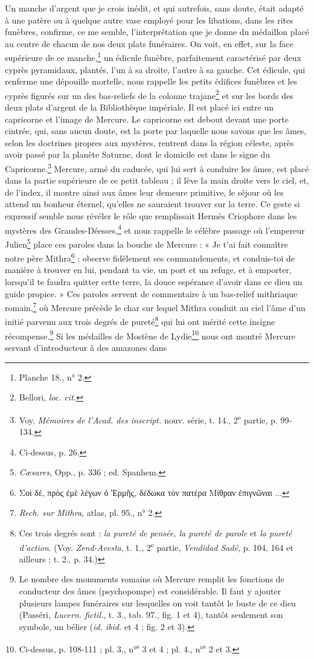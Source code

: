 \documentclass{article}
\begin{document}
Un manche d'argent que je crois inédit, et qui autrefois, sans doute, était adapté à une patère ou à quelque autre vase employé pour les libations, dans les rites funèbres, confirme, ce me semble, l'interprétation que je donne du médaillon placé au centre de chacun de nos deux plats funéraires. On voit, en effet, sur la face supérieure de ce manche,\footnote{Planche 18., n° 2.} un édicule funèbre, parfaitement caractérisé par deux cyprès pyramidaux, plantés, l'un à sa droite, l'autre à sa gauche. Cet édicule, qui renferme une dépouille mortelle, nous rappelle les petits édifices funèbres et les cyprès figurés sur un des bas-reliefs de la colonne trajane\footnote{Bellori, \emph{loc. cit.}} et sur les bords des deux plats d'argent de la Bibliothèque impériale. Il est placé ici entre un capricorne et l'image de Mercure. Le capricorne est debout devant une porte cintrée, qui, sans aucun doute, est la porte par laquelle nous savons que les âmes, selon les doctrines propres aux mystères, rentrent dans la région céleste, après avoir passé par la planète Saturne, dont le domicile est dans le signe du Capricorne.\footnote{Voy. \emph{Mémoires de l'Acad. des inscript.} nouv. série, t. 14., 2\textsuperscript{e} partie, p. 99-134.} Mercure, armé du caducée, qui lui sert à conduire les âmes, est placé dans la partie supérieure de ce petit tableau ; il lève la main droite vers le ciel, et, de l'index, il montre ainsi aux âmes leur demeure primitive, le séjour où les attend un bonheur éternel, qu'elles ne sauraient trouver sur la terre. Ce geste si expressif semble nous révéler le rôle que remplissait Hermès Criophore dans les mystères des Grandes-Déesses,\footnote{Ci-dessus, p. 26.} et nous rappelle le célèbre passage où l'empereur Julien\footnote{\emph{Cæsares}, Opp., p. 336 ; ed. Spanhem.} place ces paroles dans la bouche de Mercure : « Je t'ai fait connaître notre père Mithra\footnote{\textgreek{Σοὶ δὲ, πρὸς ἐμὲ λέγων ὁ Ἑρμῆς, δέδωκα τὸν πατέρα Μίθραν ἐπιγνῶναι} ...} ; observe fidèlement ses commandements, et conduis-toi de manière à trouver en lui, pendant ta vie, un port et un refuge, et à emporter, lorsqu'il te faudra quitter cette terre, la douce espérance d'avoir dans ce dieu un guide propice. » Ces paroles servent de commentaire à un bas-relief mithriaque romain,\footnote{\emph{Rech. sur Mithra}, atlas, pl. 95., n° 2.} où Mercure précède le char sur lequel Mithra conduit au ciel l'âme d'un initié parvenu aux trois degrés de pureté\footnote{Ces trois degrés sont : \emph{la pureté de pensée, la pureté de parole} et \emph{la pureté d'action}. (Voy. \emph{Zend-Avesta}, t. 1., 2\textsuperscript{e} partie, \emph{Vendidad Sadé}, p. 104, 164 et ailleurs ; t. 2., p. 34.)} qui lui ont mérité cette insigne récompense.\footnote{Le nombre des monuments romains où Mercure remplit les fonctions de conducteur des âmes (psychopompe) est considérable. Il faut y ajouter plusieurs lampes funéraires sur lesquelles on voit tantôt le buste de ce dieu (Passéri, \emph{Lucern. fictil.}, t. 3., tab. 97., fig. 1 et 4), tantôt seulement son symbole, un bélier (\emph{id. ibid.} et 4 ; fig. 2 et 3).} Si les médailles de Mostène de Lydie\footnote{Ci-dessus, p. 108-111 ; pl. 3., n°\textsuperscript{s} 3 et 4 ; pl. 4., n°\textsuperscript{s} 2 et 3.} nous ont montré Mercure servant d'introducteur à des amazones dans 
\end{document}
